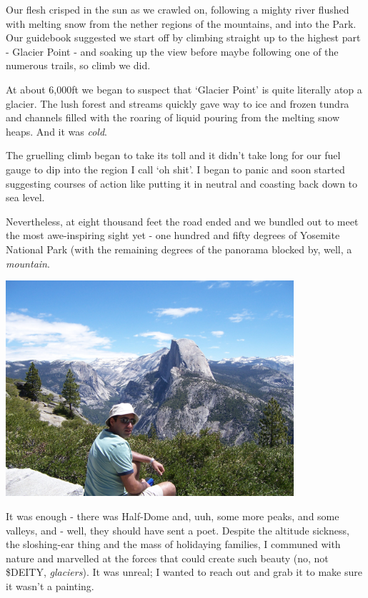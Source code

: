 \documentclass[a5paper,titlepage,11pt]{book}
\begin{document}
Our flesh crisped in the sun as we crawled on, following a mighty river flushed with melting snow from the nether regions of the mountains, and into the Park.  Our guidebook suggested we start off by climbing straight up to the highest part - Glacier Point - and soaking up the view before maybe following one of the numerous trails, so climb we did.

At about 6,000ft we began to suspect that `Glacier Point' is quite literally atop a glacier.  The lush forest and streams quickly gave way to ice and frozen tundra and channels filled with the roaring of liquid pouring from the melting snow heaps.  And it was \emph{cold}.

The gruelling climb began to take its toll and it didn't take long for our fuel gauge to dip into the region I call `oh shit'.  I began to panic and soon started suggesting courses of action like putting it in neutral and coasting back down to sea level.

Nevertheless, at eight thousand feet the road ended and we bundled out to meet the most awe-inspiring sight yet - one hundred and fifty degrees of Yosemite National Park (with the remaining degrees of the panorama blocked by, well, a \emph{mountain}.

\begin{center}\includegraphics[width=0.8\textwidth]{gfx/100_1213}\end{center}

It was enough - there was Half-Dome and, uuh, some more peaks, and some valleys, and - well, they should have sent a poet.  Despite the altitude sickness, the sloshing-ear thing and the mass of holidaying families, I communed with nature and marvelled at the forces that could create such beauty (no, not \$DEITY, \emph{glaciers}).  It was unreal; I wanted to reach out and grab it to make sure it wasn't a painting.
\end{document}
